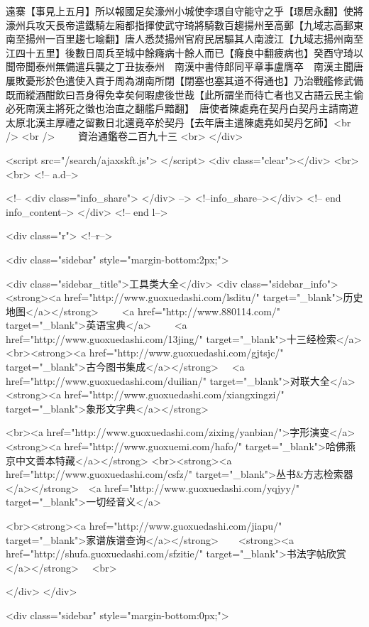 遠寨【事見上五月】所以報國足矣濠州小城使李璟自守能守之乎【璟居永翻】使將濠州兵攻天長帝遣鐵騎左廂都指揮使武守琦將騎數百趨揚州至高郵【九域志高郵東南至揚州一百里趨七喻翻】唐人悉焚揚州官府民居驅其人南渡江【九域志揚州南至江四十五里】後數日周兵至城中餘癃病十餘人而已【癃良中翻疲病也】癸酉守琦以聞帝聞泰州無備遣兵襲之丁丑抜泰州　南漢中書侍郎同平章事盧膺卒　南漢主聞唐屢敗憂形於色遣使入貢于周為湖南所閉【閉塞也塞其道不得通也】乃治戰艦修武備既而縱酒酣飲曰吾身得免幸矣何暇慮後世哉【此所謂坐而待亡者也又古語云民主偷必死南漢主將死之徵也治直之翻艦戶黯翻】　唐使者陳處堯在契丹白契丹主請南遊太原北漢主厚禮之留數日北還竟卒於契丹【去年唐主遣陳處堯如契丹乞師】<br />
<br />
　　資治通鑑卷二百九十三  <br>
   </div> 

<script src="/search/ajaxskft.js"> </script>
 <div class="clear"></div>
<br>
<br>
 <!-- a.d-->

 <!--
<div class="info_share">
</div> 
-->
 <!--info_share--></div>   <!-- end info_content-->
  </div> <!-- end l-->

<div class="r">   <!--r-->



<div class="sidebar"  style="margin-bottom:2px;">

 
<div class="sidebar_title">工具类大全</div>
<div class="sidebar_info">
<strong><a href="http://www.guoxuedashi.com/lsditu/" target="_blank">历史地图</a></strong>　　
<a href="http://www.880114.com/" target="_blank">英语宝典</a>　　
<a href="http://www.guoxuedashi.com/13jing/" target="_blank">十三经检索</a>　
<br><strong><a href="http://www.guoxuedashi.com/gjtsjc/" target="_blank">古今图书集成</a></strong>　
<a href="http://www.guoxuedashi.com/duilian/" target="_blank">对联大全</a>　<strong><a href="http://www.guoxuedashi.com/xiangxingzi/" target="_blank">象形文字典</a></strong>　

<br><a href="http://www.guoxuedashi.com/zixing/yanbian/">字形演变</a>　　<strong><a href="http://www.guoxuemi.com/hafo/" target="_blank">哈佛燕京中文善本特藏</a></strong>
<br><strong><a href="http://www.guoxuedashi.com/csfz/" target="_blank">丛书&方志检索器</a></strong>　<a href="http://www.guoxuedashi.com/yqjyy/" target="_blank">一切经音义</a>　　

<br><strong><a href="http://www.guoxuedashi.com/jiapu/" target="_blank">家谱族谱查询</a></strong>　　<strong><a href="http://shufa.guoxuedashi.com/sfzitie/" target="_blank">书法字帖欣赏</a></strong>　
<br>

</div>
</div>


<div class="sidebar" style="margin-bottom:0px;">

